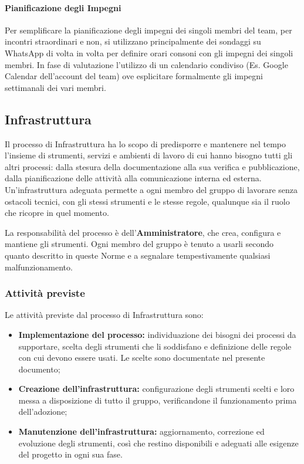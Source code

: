 \documentclass[documento]{gpt}
\begin{document}
	\paragraph{Pianificazione degli Impegni}
	Per semplificare la pianificazione degli impegni dei singoli membri del team, per incontri straordinari e non, si utilizzano principalmente dei sondaggi su WhatsApp di volta in volta per definire orari consoni con gli impegni dei singoli membri. In fase di valutazione l'utilizzo di un calendario condiviso (Es. Google Calendar dell'account del team) ove esplicitare formalmente gli impegni settimanali dei vari membri.
	
	\subsection{Infrastruttura}
	Il processo di Infrastruttura ha lo scopo di predisporre e mantenere nel tempo
	l'insieme di strumenti, servizi e ambienti di lavoro di cui hanno bisogno tutti
	gli altri processi: dalla stesura della documentazione alla sua verifica e
	pubblicazione, dalla pianificazione delle attività alla comunicazione interna
	ed esterna. Un'infrastruttura adeguata permette a ogni membro del gruppo di
	lavorare senza ostacoli tecnici, con gli stessi strumenti e le stesse regole,
	qualunque sia il ruolo che ricopre in quel momento.
	
	La responsabilità del processo è dell'\textbf{Amministratore}, che crea,
	configura e mantiene gli strumenti. Ogni membro del gruppo è tenuto a usarli
	secondo quanto descritto in queste Norme e a segnalare tempestivamente
	qualsiasi malfunzionamento.
	
	\subsubsection{Attività previste}
	Le attività previste dal processo di Infrastruttura sono:
	\begin{itemize}
		\item \textbf{Implementazione del processo:} individuazione dei bisogni dei
		processi da supportare, scelta degli strumenti che li soddisfano e
		definizione delle regole con cui devono essere usati. Le scelte sono
		documentate nel presente documento;
		\item \textbf{Creazione dell'infrastruttura:} configurazione degli
		strumenti scelti e loro messa a disposizione di tutto il gruppo,
		verificandone il funzionamento prima dell'adozione;
		\item \textbf{Manutenzione dell'infrastruttura:} aggiornamento,
		correzione ed evoluzione degli strumenti, così che restino
		disponibili e adeguati alle esigenze del progetto in ogni sua fase.
	\end{itemize}
	
\end{document}
